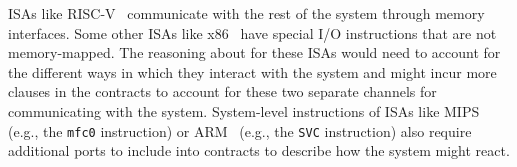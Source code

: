ISAs like RISC-V~\cite{riscv_privileged} communicate with the rest of the system through memory interfaces.
Some other ISAs like x86~\cite{intel_x86_manual} have special I/O instructions that are not memory-mapped.
The reasoning about \pics for these ISAs would need to account for the different ways in which they interact with the system and might incur more clauses in the contracts to account for these two separate channels for communicating with the system.
System-level instructions of ISAs like MIPS~\cite{mips_isa} (e.g., the \texttt{mfc0} instruction) or ARM~\cite{armv8_isa} (e.g., the \texttt{SVC} instruction) also require additional ports to include into contracts to describe how the system might react.
